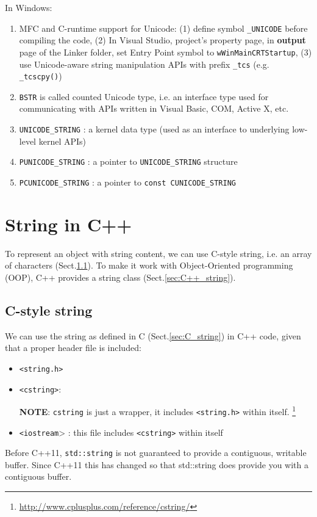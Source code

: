In Windows: 
\begin{enumerate}
  \item MFC and C-runtime support for Unicode: (1) define symbol \verb!_UNICODE!
  before compiling the code, (2) In Visual Studio, project's property page, in
  {\bf output} page of the Linker folder, set Entry Point symbol to
  \verb!wWinMainCRTStartup!, (3) use Unicode-aware string manipulation APIs with
  prefix \verb!_tcs! (e.g. \verb!_tcscpy()!)
  
  \item  \verb!BSTR! is called counted Unicode type, i.e. an interface type
used for communicating with APIs written in Visual Basic, COM, Active X,
etc.

  \item \verb!UNICODE_STRING! : a kernel data type (used as an interface to
  underlying low-level kernel APIs)
  
  \item \verb!PUNICODE_STRING! : a pointer to \verb!UNICODE_STRING! structure
  
  \item \verb!PCUNICODE_STRING! : a pointer to \verb!const CUNICODE_STRING! 
\end{enumerate}


\section{String in C++}

To represent an object with string content, we can use C-style string, i.e.
an array of characters (Sect.\ref{sec:C-style-string}). 
To make it work with Object-Oriented programming (OOP), C++ provides a string
class (Sect.\ref{sec:C++_string}).


\subsection{ C-style string}
\label{sec:C-style-string}

We can use the string as defined in C (Sect.\ref{sec:C_string}) in C++ code,
given that a proper header file is included: 
\begin{itemize}
  \item \verb!<string.h>!
  
  \item \verb!<cstring>!: 

{\bf NOTE}: \verb!cstring! is just a wrapper, it includes \verb!<string.h>!
within itself.
\footnote{\url{http://www.cplusplus.com/reference/cstring/}}

  \item \verb!<iostream!> : this file includes \verb!<cstring>! within itself
\end{itemize}
Before C++11, \verb!std::string! is not guaranteed to provide a
contiguous, writable buffer. Since C++11 this has changed so that std::string
does provide you with a contiguous buffer.

